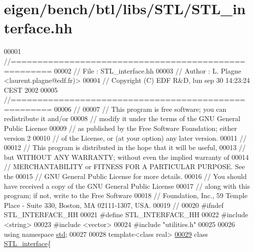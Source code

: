 \hypertarget{eigen_2bench_2btl_2libs_2_s_t_l_2_s_t_l__interface_8hh_source}{}\section{eigen/bench/btl/libs/\+S\+T\+L/\+S\+T\+L\+\_\+interface.hh}
\label{eigen_2bench_2btl_2libs_2_s_t_l_2_s_t_l__interface_8hh_source}

\begin{DoxyCode}
00001 \textcolor{comment}{//=====================================================}
00002 \textcolor{comment}{// File   :  STL\_interface.hh}
00003 \textcolor{comment}{// Author :  L. Plagne <laurent.plagne@edf.fr)>}
00004 \textcolor{comment}{// Copyright (C) EDF R&D,  lun sep 30 14:23:24 CEST 2002}
00005 \textcolor{comment}{//=====================================================}
00006 \textcolor{comment}{//}
00007 \textcolor{comment}{// This program is free software; you can redistribute it and/or}
00008 \textcolor{comment}{// modify it under the terms of the GNU General Public License}
00009 \textcolor{comment}{// as published by the Free Software Foundation; either version 2}
00010 \textcolor{comment}{// of the License, or (at your option) any later version.}
00011 \textcolor{comment}{//}
00012 \textcolor{comment}{// This program is distributed in the hope that it will be useful,}
00013 \textcolor{comment}{// but WITHOUT ANY WARRANTY; without even the implied warranty of}
00014 \textcolor{comment}{// MERCHANTABILITY or FITNESS FOR A PARTICULAR PURPOSE.  See the}
00015 \textcolor{comment}{// GNU General Public License for more details.}
00016 \textcolor{comment}{// You should have received a copy of the GNU General Public License}
00017 \textcolor{comment}{// along with this program; if not, write to the Free Software}
00018 \textcolor{comment}{// Foundation, Inc., 59 Temple Place - Suite 330, Boston, MA  02111-1307, USA.}
00019 \textcolor{comment}{//}
00020 \textcolor{preprocessor}{#ifndef STL\_INTERFACE\_HH}
00021 \textcolor{preprocessor}{#define STL\_INTERFACE\_HH}
00022 \textcolor{preprocessor}{#include <string>}
00023 \textcolor{preprocessor}{#include <vector>}
00024 \textcolor{preprocessor}{#include "utilities.h"}
00025 
00026 \textcolor{keyword}{using namespace }\hyperlink{namespacestd}{std};
00027 
00028 \textcolor{keyword}{template}<\textcolor{keyword}{class} real>
\hyperlink{class_s_t_l__interface}{00029} \textcolor{keyword}{class }\hyperlink{class_s_t_l__interface}{STL\_interface}\{

\end{DoxyCode}
